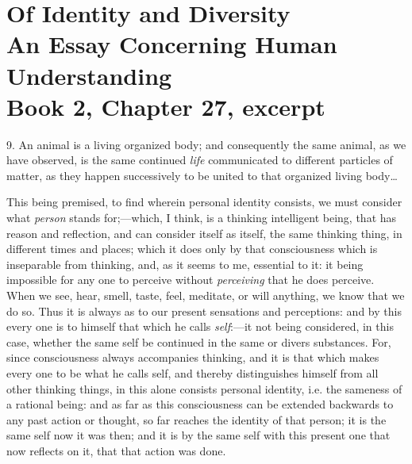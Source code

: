 
\author{John Locke}
\chapter[John Locke -- Of Identity and Diversity, excerpt]{Of Identity
and Diversity\\\smaller An Essay Concerning Human
Understanding\\\smaller Book 2, Chapter 27, excerpt}


9. An animal is a living organized body; and consequently
the same animal, as we have observed, is the same continued
\textit{life} communicated to different particles of matter, as they
happen successively to be united to that organized living body\ldots

This being premised, to find wherein personal
identity consists, we must consider what \textit{person} stands
for;---which, I think, is a thinking intelligent being, that has
reason and reflection, and can consider itself as itself, the same
thinking thing, in different times and places; which it does only by
that consciousness which is inseparable from thinking, and, 
as it seems to me, essential to it: it being impossible for any one
to perceive without \textit{perceiving} that he does perceive. When we
see, hear, smell, taste, feel, meditate, or will anything, we know
that we do so. Thus it is always as to our present sensations and
perceptions: and by this every one is to himself that which he calls
\textit{self}:---it not being considered, in this case, whether the
same self be continued in the same or divers substances. For, since
consciousness always accompanies thinking, and it is that which
makes every one to be what he calls self, and thereby distinguishes
himself from all other thinking things, in this alone consists
personal identity, i.e. the sameness of a rational being: and as far
as this consciousness can be extended backwards to any past action or
thought, so far reaches the identity of that person; it is the same
self now it was then; and it is by the same self with this present one
that now reflects on it, that that action was done.

